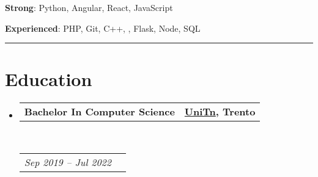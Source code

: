 \documentclass[10pt,a4paper,hidelinks]{article}
\makeatletter
\newenvironment{indentsection}[1]%
{\begin{list}{}%
	{\setlength{\leftmargin}{#1}}%
	\item[]%
}
{\end{list}}
\newcommand{\headerrow}[2]
{\begin{tabular*}{\linewidth}{l@{\extracolsep{\fill}}r}
	#1 &
	#2 \\
\end{tabular*}}
\makeatother
\begin{document}
\begin{indentsection}{\parindent}
\begin{flushleft}
    \textbf{Strong}: Python, Angular, React, JavaScript 
\end{flushleft}
\vspace{-1.0em}
\begin{flushleft}
    \textbf{Experienced}: PHP, Git, C++, , Flask, Node, SQL
\end{flushleft}
\end{indentsection}



{\color{IFMediumGreen} \hrule}
\vspace{-0.3em}
{\color{IFDarkGreen}\section*{Education}}

\begin{itemize}
	\parskip=0.1em

	\item 
	\headerrow
		{\textbf{Bachelor In Computer Science}}
		{\textbf{\colorbox{IFLightGreen!30}{\href{https://www.unitn.it/}{\textbf{UniTn}}}{, Trento}}}
	\\
	\headerrow
		{\emph{Sep 2019 -- Jul 2022}}
		{\emph{}}

\end{itemize}



%
%
%	
%
\end{document}

